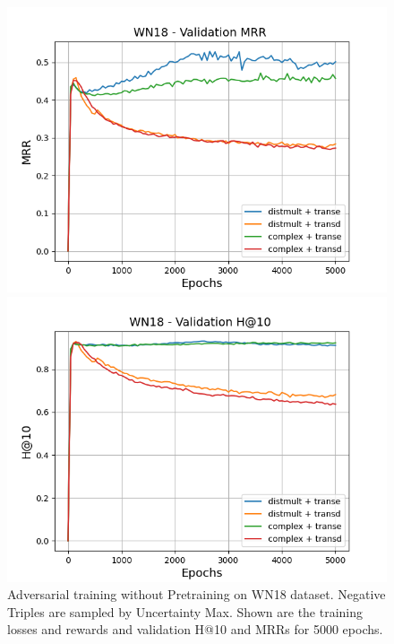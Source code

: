 \begin{figure}
\begin{minipage}{.5\textwidth}
    \end{minipage}
    \begin{minipage}{.5\textwidth}
      \centering
      \includegraphics[width=0.9\linewidth]{figures/results/gan_train/not_pretrained/uncertainty/max/entropy/wn18/gan_train_uncertainty_wn18_mrrs.png}
    \end{minipage}%
    \begin{minipage}{.5\textwidth}
      \centering
      \includegraphics[width=0.9\linewidth]{figures/results/gan_train/not_pretrained/uncertainty/max/entropy/wn18/gan_train_uncertainty_wn18_hit10s.png}
    \end{minipage}%
    \caption{Adversarial training without Pretraining on \textsc{WN18} dataset. 
    Negative Triples are sampled by Uncertainty Max.
    Shown are the training losses and rewards and validation H@10 and MRRs for 5000 epochs.}
    \label{fig:advtrain_wn18_not_pretrained_uncertainty_max}
\end{figure}

